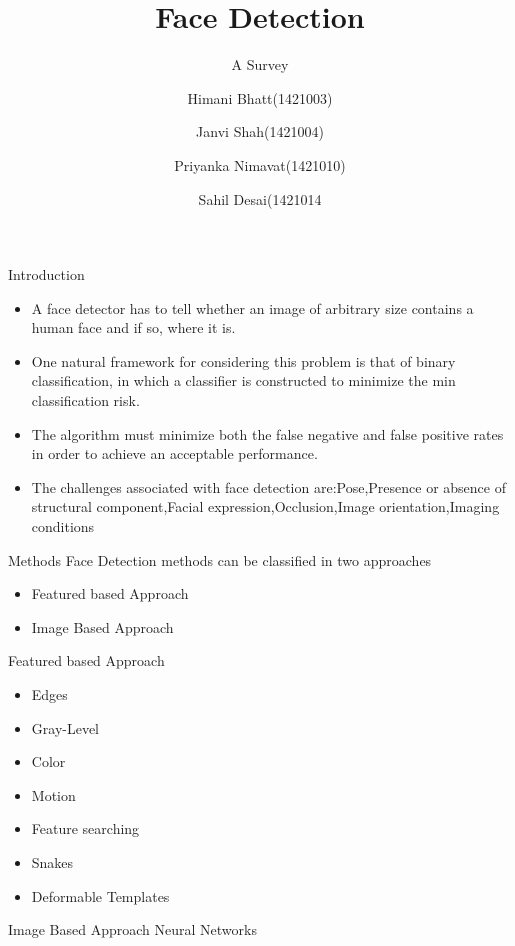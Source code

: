 \documentclass{beamer}
\title{Face Detection}
\subtitle{A Survey}
\author{Himani Bhatt(1421003) \and Janvi Shah(1421004)\\ \and Priyanka Nimavat(1421010) \and Sahil Desai(1421014}
\institute[IET-Ahmedabad University] %
{
  Present To:\\
  Prof.Mehul Raval\\
  
  \and
  Prof.Ratnik Gandhi\\
  
  Dhruv Gupta
  }
\date{}
\begin{document}
\begin{frame}
  \titlepage
\end{frame}

\begin{frame}{Introduction}
  \begin{itemize}
  \item {
    A face detector has to tell whether an image of arbitrary size contains a human face and if so, where it is.
  }
  \item {
    One natural framework for considering this problem is that of binary classification, in which a classifier is constructed to minimize the min classification risk.
  }
  \item{
  The algorithm must minimize both the false negative and false positive rates in order to achieve an acceptable performance.
  }
  \item{
  The challenges associated with face detection are:Pose,Presence or absence of structural component,Facial expression,Occlusion,Image orientation,Imaging conditions
  }
  \end{itemize}
\end{frame}

\begin{frame}{Methods}
Face Detection methods can be classified in two approaches
\begin{itemize}
\item Featured based Approach
\item Image Based Approach
\end{itemize}
\end{frame}

\begin{frame}{Featured based Approach}

\begin{itemize}
\item Edges
\item Gray-Level
\item Color
\item Motion
\item Feature searching
\item Snakes
\item Deformable Templates
\end{itemize}

\end{frame}

\begin{frame}{Image Based Approach}
Neural Networks


\end{frame}
\end{document}
